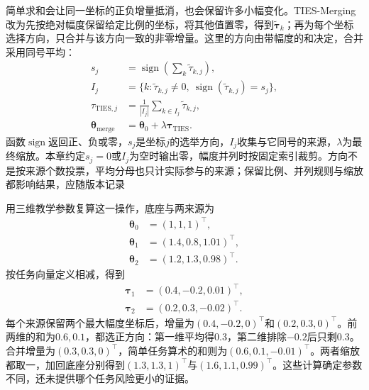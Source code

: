 简单求和会让同一坐标的正负增量抵消，也会保留许多小幅变化。TIES-Merging改为先按绝对幅度保留给定比例的坐标，将其他值置零，得到$\widetilde{\bm{\tau}}_k$；再为每个坐标选择方向，只合并与该方向一致的非零增量。这里的方向由带幅度的和决定，合并采用同号平均：
\begin{equation}
  \begin{aligned}
    s_j&=\operatorname{sign}\!\left(\sum_k\widetilde{\tau}_{k,j}\right),\\
    I_j&=\{k:\widetilde{\tau}_{k,j}\neq0,\
                    \operatorname{sign}(\widetilde{\tau}_{k,j})=s_j\},\\
    \tau_{\mathrm{TIES},j}
      &=\frac{1}{|I_j|}\sum_{k\in I_j}\widetilde{\tau}_{k,j},\\
    \bm{\theta}_{\mathrm{merge}}
      &=\bm{\theta}_0+\lambda\bm{\tau}_{\mathrm{TIES}}.
  \end{aligned}
  \label{eq:ket-integration-ties}
\end{equation}
函数$\operatorname{sign}$返回正、负或零，$s_j$是坐标$j$的选举方向，$I_j$收集与它同号的来源，$\lambda$为最终缩放。本章约定$s_j=0$或$I_j$为空时输出零，幅度并列时按固定索引裁剪。方向不是按来源个数投票，平均分母也只计实际参与的来源；保留比例、并列规则与缩放都影响结果，应随版本记录

用三维教学参数复算这一操作，底座与两来源为
\[
  \begin{aligned}
    \bm{\theta}_0&=(1,1,1)^\top,\\
    \bm{\theta}_1&=(1.4,0.8,1.01)^\top,\\
    \bm{\theta}_2&=(1.2,1.3,0.98)^\top.
  \end{aligned}
\]
按任务向量定义相减，得到
\[
  \begin{aligned}
    \bm{\tau}_1&=(0.4,-0.2,0.01)^\top,\\
    \bm{\tau}_2&=(0.2,0.3,-0.02)^\top.
  \end{aligned}
\]
每个来源保留两个最大幅度坐标后，增量为$(0.4,-0.2,0)^\top$和$(0.2,0.3,0)^\top$。前两维的和为$0.6,0.1$，都选正方向：第一维平均得$0.3$，第二维排除$-0.2$后只剩$0.3$。合并增量为$(0.3,0.3,0)^\top$，简单任务算术的和则为$(0.6,0.1,-0.01)^\top$。两者缩放都取一，加回底座分别得到$(1.3,1.3,1)^\top$与$(1.6,1.1,0.99)^\top$。这些计算确定参数不同，还未提供哪个任务风险更小的证据。

